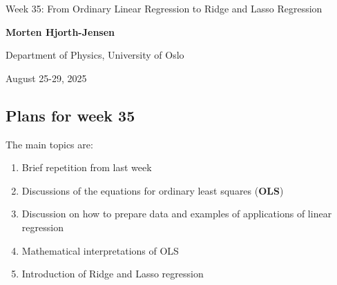 \documentclass[%
oneside,                 %
final,                   %
10pt]{article}
\begin{document}

\newcommand{\exercisesection}[1]{\subsection*{#1}}






\thispagestyle{empty}

\begin{center}
{\LARGE\bf
\begin{spacing}{1.25}
Week 35: From Ordinary Linear Regression to Ridge and Lasso Regression
\end{spacing}
}
\end{center}


\begin{center}
{\bf Morten Hjorth-Jensen}
\end{center}

    \begin{center}
\centerline{{\small Department of Physics, University of Oslo}}
\end{center}
    

\begin{center}
August 25-29, 2025
\end{center}

\vspace{1cm}


\subsection*{Plans for week 35}

The main topics are:

\begin{enumerate}
\item Brief repetition from last week

\item Discussions  of the equations for ordinary least squares (\textbf{OLS})

\item Discussion on how to prepare data and examples of applications of linear regression

\item Mathematical interpretations of OLS

\item Introduction of Ridge and Lasso regression
\end{enumerate}
\end{document}
